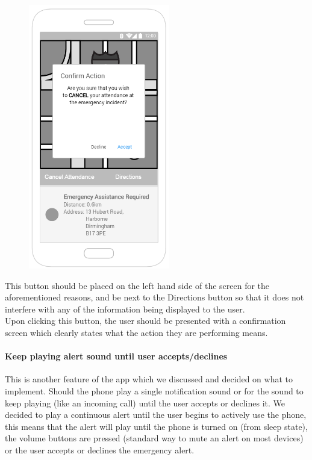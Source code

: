 \documentclass{article}
\begin{document}
\begin{figure}
  \begin{center}
  \vspace{-30pt}
    \includegraphics[width=0.55\textwidth]{"Iteration2/Iteration 1 - Accept_Decline Buttons 3"}
  \end{center}
  \vspace{-250pt}
\end{figure}


This button should be placed on the left hand side of the screen for the aforementioned reasons, and be next to the Directions button so that it does not interfere with any of the information being displayed to the user.\\

Upon clicking this button, the user should be presented with a confirmation screen which clearly states what the action they are performing means.\\

\pagebreak
\paragraph{Keep playing alert sound until user accepts/declines}
This is another feature of the app which we discussed and decided on what to implement. Should the phone play a single notification sound or for the sound to keep playing (like an incoming call) until the user accepts or declines it. We decided to play a continuous alert until the user begins to actively use the phone, this means that the alert will play until the phone is turned on (from sleep state), the volume buttons are pressed (standard way to mute an alert on most devices) or the user accepts or declines the emergency alert.\\
\end{document}
